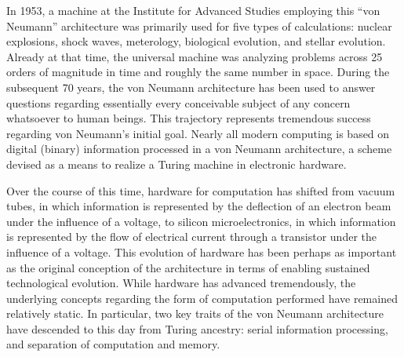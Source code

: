 In 1953, a machine at the Institute for Advanced Studies employing this ``von Neumann'' architecture was primarily used for five types of calculations: nuclear explosions, shock waves, meterology, biological evolution, and stellar evolution. Already at that time, the universal machine was analyzing problems across 25 orders of magnitude in time and roughly the same number in space. During the subsequent 70 years, the von Neumann architecture has been used to answer questions regarding essentially every conceivable subject of any concern whatsoever to human beings. This trajectory represents tremendous success regarding von Neumann's initial goal. Nearly all modern computing is based on digital (binary) information processed in a von Neumann architecture, a scheme devised as a means to realize a Turing machine in electronic hardware. 

Over the course of this time, hardware for computation has shifted from vacuum tubes, in which information is represented by the deflection of an electron beam under the influence of a voltage, to silicon microelectronics, in which information is represented by the flow of electrical current through a transistor under the influence of a voltage. This evolution of hardware has been perhaps as important as the original conception of the architecture  in terms of enabling sustained technological evolution. While hardware has advanced tremendously, the underlying concepts regarding the form of computation performed have remained relatively static. In particular, two key traits of the von Neumann architecture have descended to this day from Turing ancestry: serial information processing, and separation of computation and memory. 

